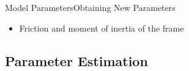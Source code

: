 \begin{frame}{Model Parameters}{Obtaining New Parameters}
{\begin{figure}[H]
  \end{figure}
  }
  \begin{itemize}
    \item Friction and moment of inertia of the frame
  \end{itemize}
\end{frame}

\subsection{Parameter Estimation}


